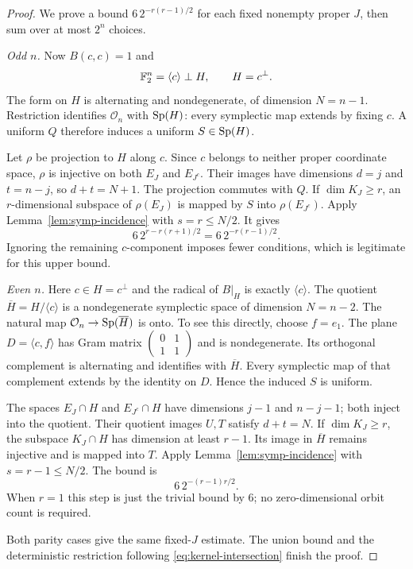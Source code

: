 \begin{proof}
We prove a bound $6\,2^{-r(r-1)/2}$ for each fixed nonempty proper $J$, then sum over at most $2^n$ choices.

\emph{Odd $n$.}
Now $B(c,c)=1$ and
\[
 \mathbb F_2^n=\langle c\rangle\perp H,\qquad H=c^\perp.
\]
The form on $H$ is alternating and nondegenerate, of dimension $N=n-1$. Restriction identifies $\mathcal O_n$ with $\operatorname{Sp}(H)$: every symplectic map extends by fixing $c$. A uniform $Q$ therefore induces a uniform $S\in\operatorname{Sp}(H)$.

Let $\rho$ be projection to $H$ along $c$. Since $c$ belongs to neither proper coordinate space, $\rho$ is injective on both $E_J$ and $E_{J^c}$. Their images have dimensions $d=j$ and $t=n-j$, so $d+t=N+1$. The projection commutes with $Q$. If $\dim K_J\ge r$, an $r$-dimensional subspace of $\rho(E_J)$ is mapped by $S$ into $\rho(E_{J^c})$. Apply Lemma~\ref{lem:symp-incidence} with $s=r\le N/2$. It gives
\[
 6\,2^{r-r(r+1)/2}=6\,2^{-r(r-1)/2}.
\]
Ignoring the remaining $c$-component imposes fewer conditions, which is legitimate for this upper bound.

\emph{Even $n$.}
Here $c\in H=c^\perp$ and the radical of $B|_H$ is exactly $\langle c\rangle$. The quotient
$\overline H=H/\langle c\rangle$ is a nondegenerate symplectic space of dimension $N=n-2$.
The natural map $\mathcal O_n\to\operatorname{Sp}(\overline H)$ is onto. To see this directly, choose $f=e_1$. The plane $D=\langle c,f\rangle$ has Gram matrix
$\left(\begin{smallmatrix}0&1\\1&1\end{smallmatrix}\right)$ and is nondegenerate. Its orthogonal complement is alternating and identifies with $\overline H$. Every symplectic map of that complement extends by the identity on $D$. Hence the induced $S$ is uniform.

The spaces $E_J\cap H$ and $E_{J^c}\cap H$ have dimensions $j-1$ and $n-j-1$; both inject into the quotient. Their quotient images $U,T$ satisfy $d+t=N$.
If $\dim K_J\ge r$, the subspace $K_J\cap H$ has dimension at least $r-1$. Its image in $\overline H$ remains injective and is mapped into $T$. Apply Lemma~\ref{lem:symp-incidence} with $s=r-1\le N/2$. The bound is
\[
 6\,2^{-(r-1)r/2}.
\]
When $r=1$ this step is just the trivial bound by $6$; no zero-dimensional orbit count is required.

Both parity cases give the same fixed-$J$ estimate. The union bound and the deterministic restriction following \eqref{eq:kernel-intersection} finish the proof.
\end{proof}

